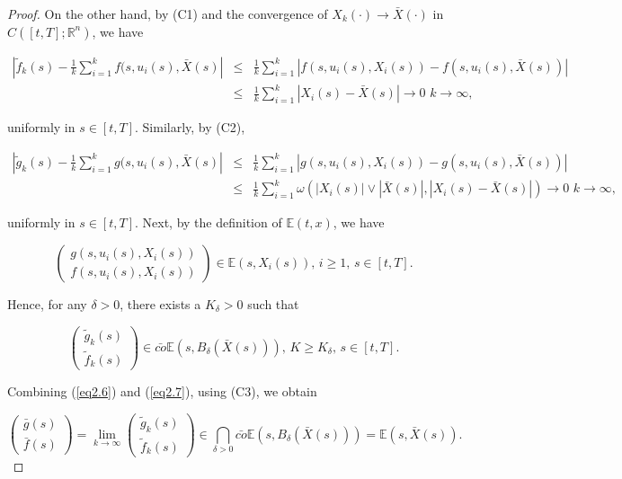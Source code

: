 \begin{proof}
On the other hand, by (C1) and the convergence of $X_k(\cdot)\rightarrow \bar{X}(\cdot)$ in $C([t,T];\mathbb{R}^n)$, we have

\begin{eqnarray*}
|\tilde{f}_k(s)-\frac{1}{k}\sum_{i=1}^{k}f(s,u_i(s),\bar{X}(s)|&\leq& \frac{1}{k}\sum_{i=1}^{k}|f(s,u_i(s),X_i(s))-f(s,u_i(s),\bar{X}(s))|\\
&\leq&\frac{1}{k}\sum_{i=1}^{k}|X_i(s)-\bar{X}(s)|\rightarrow 0\,\,k\rightarrow \infty,
\end{eqnarray*}

uniformly in $s\in [t,T]$. Similarly, by (C2),

\begin{eqnarray*}
	|\tilde{g}_k(s)-\frac{1}{k}\sum_{i=1}^{k}g(s,u_i(s),\bar{X}(s)|&\leq& \frac{1}{k}\sum_{i=1}^{k}|g(s,u_i(s),X_i(s))-g(s,u_i(s),\bar{X}(s))|\\
	&\leq&\frac{1}{k}\sum_{i=1}^{k}\omega(|X_i(s)|\vee |\bar{X}(s)|,|X_i(s)-\bar{X}(s)|)\rightarrow 0\,\,k\rightarrow \infty,
\end{eqnarray*}

uniformly in $s\in [t,T]$. Next, by the definition of $\mathbb{E}(t,x)$, we have

$$\begin{pmatrix}
	g(s,u_i(s),X_i(s)) \\ f(s,u_i(s),X_i(s))
\end{pmatrix} \in \mathbb{E}(s,X_i(s)),\,i\geq 1,\, s\in [t,T].$$

Hence, for any $\delta>0$, there exists a $K_{\delta}>0$ such that 

\begin{equation}\label{eq2.7}
	\begin{pmatrix}
		\tilde{g}_k(s) \\ \tilde{f}_k(s)
	\end{pmatrix}\in \bar{co}\mathbb{E}(s,B_{\delta}(\bar{X}(s))),\, K\geq K_{\delta},\, s\in[t,T].
\end{equation}

Combining (\ref{eq2.6}) and (\ref{eq2.7}), using (C3), we obtain

\begin{equation*}
\begin{pmatrix}
\bar{g}(s) \\ \bar{f}(s)
\end{pmatrix}=\lim_{k\rightarrow \infty}\begin{pmatrix}
\tilde{g}_k(s) \\ \tilde{f}_k(s)
\end{pmatrix}\in \bigcap_{\delta>0}\bar{co}\mathbb{E}(s,B_{\delta}(\bar{X}(s)))=\mathbb{E}(s,\bar{X}(s)).
\end{equation*}


\end{proof}
